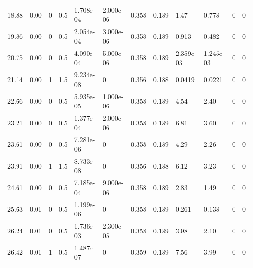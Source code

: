 \documentclass[preview]{standalone}
\begin{document}
{{\begin{tabular}{L{1.2cm}C{1.2cm} C{0.3cm}C{0.5cm} C{1.4cm}C{1.4cm} C{1.4cm}C{1.4cm} C{1.6cm}C{1.6cm} C{1.6cm}C{1.6cm}}
  18.88  &  0.00  & 0     & 0.5 &  1.708e-04  & 2.000e-06  &  0.358&   0.189& 1.47 & 0.778   &  0 & 0  \\ 
  19.86  &  0.00  & 0     & 0.5 &  2.054e-04  & 3.000e-06  &  0.358&   0.189& 0.913 & 0.482   &  0 & 0  \\ 
  20.75  &  0.00  & 0     & 0.5 &  4.090e-04  & 5.000e-06  &  0.358&   0.189& 2.359e-03 & 1.245e-03   &  0 & 0  \\ 
  21.14  &  0.00  & 1     & 1.5 &  9.234e-08  & 0  &  0.356&   0.188& 0.0419 & 0.0221   &  0 & 0  \\ 
  22.66  &  0.00  & 0     & 0.5 &  5.935e-05  & 1.000e-06  &  0.358&   0.189& 4.54 & 2.40   &  0 & 0  \\ 
  23.21  &  0.00  & 0     & 0.5 &  1.377e-04  & 2.000e-06  &  0.358&   0.189& 6.81 & 3.60   &  0 & 0  \\ 
  23.61  &  0.00  & 0     & 0.5 &  7.281e-06  & 0  &  0.358&   0.189& 4.29 & 2.26   &  0 & 0  \\ 
  23.91  &  0.00  & 1     & 1.5 &  8.733e-08  & 0  &  0.356&   0.188& 6.12 & 3.23   &  0 & 0  \\ 
  24.61  &  0.00  & 0     & 0.5 &  7.185e-04  & 9.000e-06  &  0.358&   0.189& 2.83 & 1.49   &  0 & 0  \\ 
  25.63  &  0.01  & 0     & 0.5 &  1.199e-06  & 0  &  0.358&   0.189& 0.261 & 0.138   &  0 & 0  \\ 
  26.24  &  0.01  & 0     & 0.5 &  1.736e-03  & 2.300e-05  &  0.358&   0.189& 3.98 & 2.10   &  0 & 0  \\ 
  26.42  &  0.01  & 1     & 0.5 &  1.487e-07  & 0  &  0.359&   0.189& 7.56 & 3.99   &  0 & 0  \\ 
\hline 
\end{tabular} 

}}
\end{document}
